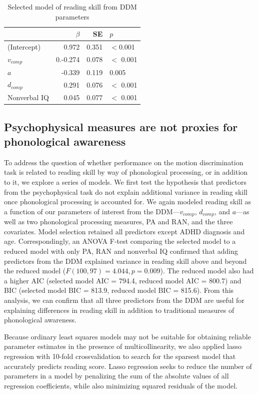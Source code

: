\documentclass[../uwthesis.tex]{subfiles}
\begin{document}
\begin{table}
\caption{Selected model of reading skill from DDM parameters}
\label{tab:p3_drift_rate_model}
\centering
    \begin{tabular}{lrrl}
    \toprule
      & $\beta$ & SE & $p$\\
    \midrule
    (Intercept) & 0.972 & 0.351 & $<$0.001\\
    $v_{comp}$ & 0.-0.274 & 0.078 & $<$ 0.001\\
    $a$ & -0.339 & 0.119 &  0.005\\
    $d_{comp}$ & 0.291 & 0.076 & $<$ 0.001\\
    Nonverbal IQ & 0.045 & 0.077 & $<$ 0.001\\
    \bottomrule
    \end{tabular}
\end{table}

\subsection{Psychophysical measures are not proxies for phonological awareness}

To address the question of whether performance on the motion discrimination task is
related to reading skill by way of phonological processing, or in addition to it, we explore a series
of models. We first test the hypothesis that predictors from the psychophysical task do not explain
additional variance in reading skill once phonological processing is accounted for. We again
modeled reading skill as a function of our parameters of interest from the DDM—$v_{comp}$, $d_{comp}$, and
$a$—as well as two phonological processing measures, PA and RAN, and the three covariates.
Model selection retained all predictors except ADHD diagnosis and age. Correspondingly, an
ANOVA F-test comparing the selected model to a reduced model with only PA, RAN and
nonverbal IQ confirmed that adding predictors from the DDM explained variance in reading skill
above and beyond the reduced model ($F(100, 97) = 4.044, p = 0.009$). The reduced model also
had a higher AIC (selected model AIC = 794.4, reduced model AIC = 800.7) and BIC (selected
model BIC = 813.9, reduced model BIC = 815.6). From this analysis, we can confirm that all three
predictors from the DDM are useful for explaining differences in reading skill in addition to
traditional measures of phonological awareness.

Because ordinary least squares models may not be suitable for obtaining reliable parameter
estimates in the presence of multicollinearity, we also applied lasso regression with 10-fold crossvalidation \cite{Friedman2010RegularizationDescent.} to search for the sparsest model that accurately predicts reading score. Lasso regression seeks to reduce the number of parameters in a model by penalizing the sum of the
absolute values of all regression coefficients, while also minimizing squared residuals of the
model.
\end{document}
